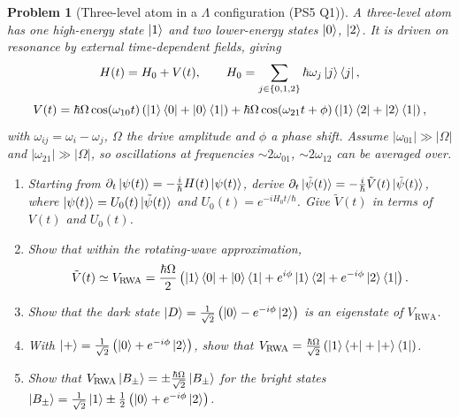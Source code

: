 \documentclass{article}
\newtheorem{problem}{Problem}
\begin{document}
\begin{problem}[Three-level atom in a $\Lambda$ configuration (PS5 Q1)]
    A three-level atom has one high-energy state $\ket{1}$ and two lower-energy states $\ket{0}$, $\ket{2}$. It is driven on resonance by external time-dependent fields, giving
    \[H(t) = H_0 + V(t), \qquad H_0 = \sum_{j\in\{0,1,2\}}\hbar\omega_j\ket{j}\bra{j},\]
    \[V(t) = \hbar\Omega\cos(\omega_{10}t)\left(\ket{1}\bra{0} + \ket{0}\bra{1}\right) + \hbar\Omega\cos(\omega_{21}t + \phi)\left(\ket{1}\bra{2} + \ket{2}\bra{1}\right),\]
    with $\omega_{ij} = \omega_i - \omega_j$, $\Omega$ the drive amplitude and $\phi$ a phase shift. Assume $|\omega_{01}| \gg |\Omega|$ and $|\omega_{21}| \gg |\Omega|$, so oscillations at frequencies $\sim 2\omega_{01}$, $\sim 2\omega_{12}$ can be averaged over.
    \begin{enumerate}[label=(\alph*)]
        \item Starting from $\partial_t\ket{\psi(t)} = -\frac{i}{\hbar}H(t)\ket{\psi(t)}$, derive $\partial_t\ket{\tilde{\psi}(t)} = -\frac{i}{\hbar}\tilde{V}(t)\ket{\tilde{\psi}(t)}$, where $\ket{\psi(t)} = U_0(t)\ket{\tilde{\psi}(t)}$ and $U_0(t) = e^{-iH_0t/\hbar}$. Give $\tilde{V}(t)$ in terms of $V(t)$ and $U_0(t)$.
        \item Show that within the rotating-wave approximation,
        \[\tilde{V}(t) \simeq V_{\mathrm{RWA}} = \frac{\hbar\Omega}{2}\left(\ket{1}\bra{0} + \ket{0}\bra{1} + e^{i\phi}\ket{1}\bra{2} + e^{-i\phi}\ket{2}\bra{1}\right).\]
        \item Show that the dark state $\ket{D} = \frac{1}{\sqrt{2}}\left(\ket{0} - e^{-i\phi}\ket{2}\right)$ is an eigenstate of $V_{\mathrm{RWA}}$.
        \item With $\ket{+} = \frac{1}{\sqrt{2}}\left(\ket{0} + e^{-i\phi}\ket{2}\right)$, show that $V_{\mathrm{RWA}} = \frac{\hbar\Omega}{\sqrt{2}}\left(\ket{1}\bra{+} + \ket{+}\bra{1}\right)$.
        \item Show that $V_{\mathrm{RWA}}\ket{B_\pm} = \pm\frac{\hbar\Omega}{\sqrt{2}}\ket{B_\pm}$ for the bright states $\ket{B_\pm} = \frac{1}{\sqrt{2}}\ket{1} \pm \frac{1}{2}\left(\ket{0} + e^{-i\phi}\ket{2}\right)$.
    \end{enumerate}
\end{problem}
\end{document}
